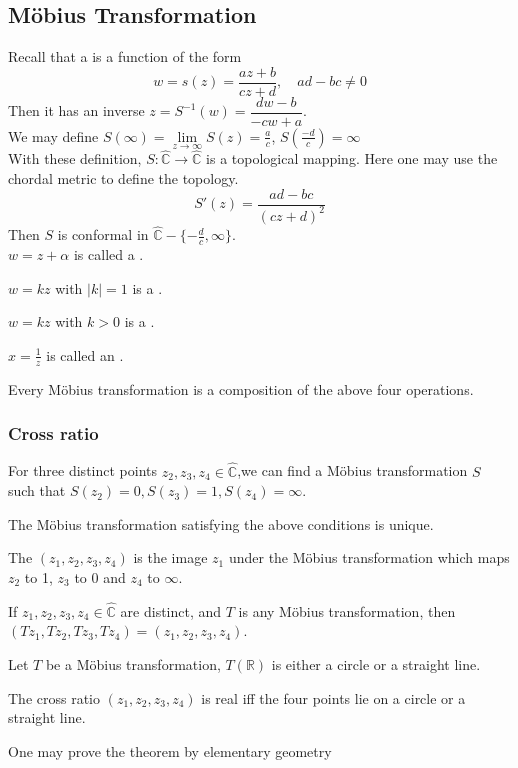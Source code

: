 \subsection{M{\"o}bius Transformation}
Recall that a  is a function of the form
\[w=s(z)=\frac{az+b}{cz+d},\quad ad-bc\neq0\]
Then it has an inverse  $ z=S^{-1}(w)=\dfrac{dw-b}{-cw+a} $.\\
We may define  $ S(\infty)=\lim\limits_{z\to \infty}S(z)=\frac{a }{c} $, $ S(\frac{-d }{c})=\infty $ \\
With these definition,  $ S:\hat{\mathbb{C}}\rightarrow\hat{\mathbb{C}} $ is a topological mapping. Here one may use the chordal metric to define the topology.\\
\[S'(z)=\frac{ad-bc}{(cz+d)^2}\]
Then  $ S  $ is conformal in  $ \hat{\mathbb{C}}-\{-\frac{d }{c},\infty\} $.\\
$ w=z+\alpha  $ is called a .

$ w=kz  $ with  $ |k|=1 $ is a .

$ w=kz $ with  $ k>0  $ is a .

$ x=\frac{1 }{z }  $ is called an .
\begin{proposition}
    Every M{\"o}bius transformation is a composition of the above four operations.
\end{proposition}    
\subsubsection{Cross ratio}
For three distinct points  $ z_2,z_3,z_4\in\hat{\mathbb{C}} $,we can find a M{\"o}bius transformation  $ S $ such that  $ S(z_2)=0,S(z_3)=1,S(z_4)=\infty $.
\begin{lemma}
    The M{\"o}bius transformation satisfying the above conditions is unique.
\end{lemma}
The  $ (z_1,z_2,z_3,z_4) $ is the image  $ z_1 $ under the M{\"o}bius transformation which maps  $ z_2  $ to 1, $ z_3  $ to 0 and $ z_4  $ to  $ \infty $.
\begin{theorem}
    If  $ z_1,z_2,z_3,z_4\in \hat{\mathbb{C}} $  are distinct, and  $ T  $ is any M{\"o}bius transformation, then $ (Tz_1,Tz_2,Tz_3,Tz_4)=(z_1,z_2,z_3,z_4) $. 
\end{theorem} 
\begin{lemma}
    Let  $ T  $ be a M{\"o}bius transformation,  $ T(\mathbb{R}) $ is either a circle or a straight line.
\end{lemma}  
\begin{theorem}
    The cross ratio  $ (z_1,z_2,z_3,z_4) $ is real iff the four points lie on a circle or a straight line.
\end{theorem}
\begin{remark}
    One may prove the theorem by elementary geometry
\end{remark}
